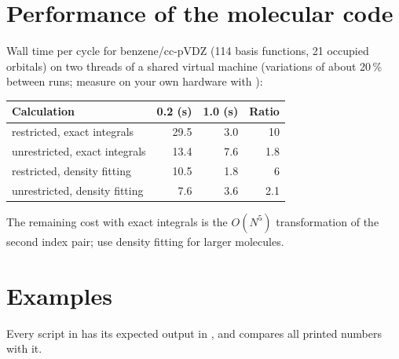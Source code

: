 \section{Performance of the molecular code}

Wall time per cycle for benzene/cc-pVDZ (114 basis functions, 21 occupied
orbitals) on two threads of a shared virtual machine (variations of about
20\,\% between runs; measure on your own hardware with
):

\begin{table}[!htb]
\centering
\small
\begin{tabular}{@{}l r r r@{}}
\toprule
Calculation & 0.2 (s) & 1.0 (s) & Ratio \\
\midrule
restricted, exact integrals     & 29.5 & 3.0 & 10 \\
unrestricted, exact integrals   & 13.4 & 7.6 & 1.8 \\
restricted, density fitting     & 10.5 & 1.8 & 6 \\
unrestricted, density fitting   & 7.6  & 3.6 & 2.1 \\
\bottomrule
\end{tabular}
\end{table}

The remaining cost with exact integrals is the $O(N^5)$ transformation of the
second index pair; use density fitting for larger molecules.

\section{Examples}

Every script in  has its expected output in
, and  compares all
printed numbers with it.


